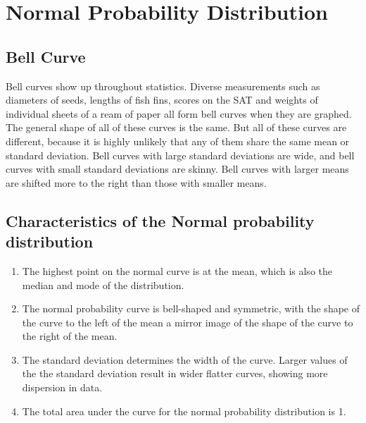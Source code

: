 \documentclass[12pt]{article}
\begin{document}
\newpage
\section{Normal Probability Distribution}

\subsection{Bell Curve}
Bell curves show up throughout statistics. Diverse measurements such as diameters of seeds, lengths of fish fins, scores on the SAT and weights of individual sheets of a ream of paper all form bell curves when they are graphed. The general shape of all of these curves is the same. But all of these curves are different, because it is highly unlikely that any of them share the same mean or standard deviation. Bell curves with large standard deviations are wide, and bell curves with small standard deviations are skinny. Bell curves with larger means are shifted more to the right than those with smaller means.

\subsection*{Characteristics of the Normal probability distribution}

\begin{enumerate}
\item The highest point on the normal curve is at the mean, which is also the median and mode of the distribution.

\item The normal probability curve is bell-shaped and symmetric, with the shape of the curve to the left of the mean a mirror image of the shape of the curve to the right of the mean.

\item The standard deviation determines the width of the curve. Larger values of the the standard deviation result in wider flatter curves, showing more dispersion in data.

\item The total area under the curve for the normal probability distribution is 1.
\end{enumerate}
\end{document}
